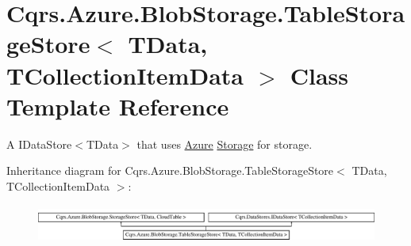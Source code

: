 \hypertarget{classCqrs_1_1Azure_1_1BlobStorage_1_1TableStorageStore}{}\section{Cqrs.\+Azure.\+Blob\+Storage.\+Table\+Storage\+Store$<$ T\+Data, T\+Collection\+Item\+Data $>$ Class Template Reference}
\label{classCqrs_1_1Azure_1_1BlobStorage_1_1TableStorageStore}


A I\+Data\+Store$<$\+T\+Data$>$ that uses \hyperlink{namespaceCqrs_1_1Azure}{Azure} \hyperlink{namespaceCqrs_1_1Azure_1_1Storage}{Storage} for storage.  


Inheritance diagram for Cqrs.\+Azure.\+Blob\+Storage.\+Table\+Storage\+Store$<$ T\+Data, T\+Collection\+Item\+Data $>$\+:\begin{figure}[H]
\begin{center}
\leavevmode
\includegraphics[height=1.264108cm]{classCqrs_1_1Azure_1_1BlobStorage_1_1TableStorageStore}
\end{center}
\end{figure}
